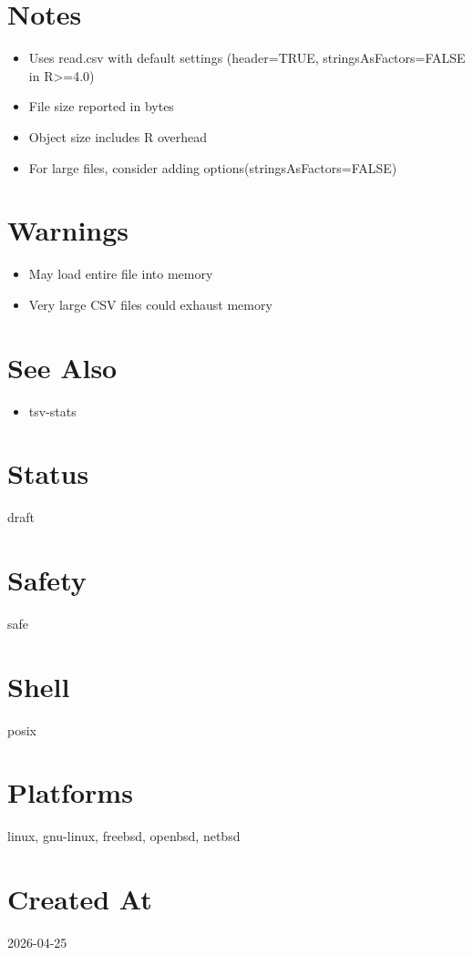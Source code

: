 \documentclass[openany]{book}
\begin{document}
\section*{Notes}
\begin{itemize}
  \item Uses read.csv with default settings (header=TRUE, stringsAsFactors=FALSE in R>=4.0)
  \item File size reported in bytes
  \item Object size includes R overhead
  \item For large files, consider adding options(stringsAsFactors=FALSE)
\end{itemize}

\section*{Warnings}
\begin{itemize}
  \item May load entire file into memory
  \item Very large CSV files could exhaust memory
\end{itemize}

\section*{See Also}
\begin{itemize}
  \item tsv-stats
\end{itemize}

\section*{Status}
draft

\section*{Safety}
safe

\section*{Shell}
posix

\section*{Platforms}
linux, gnu-linux, freebsd, openbsd, netbsd

\section*{Created At}
2026-04-25
\end{document}
